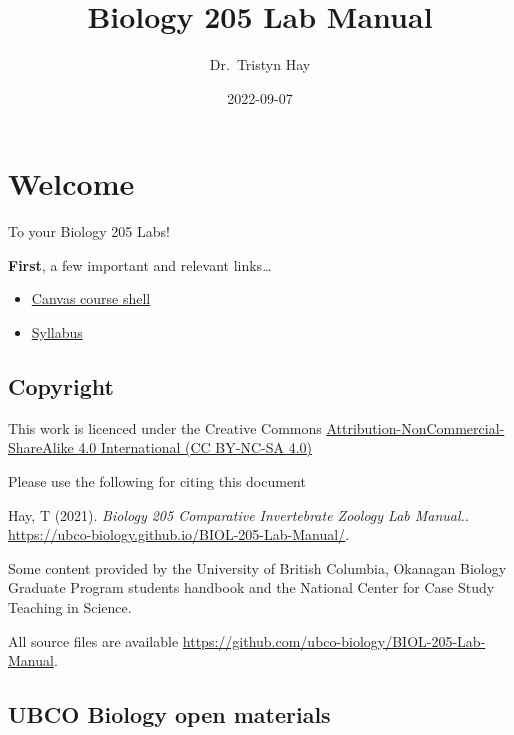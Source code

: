 \documentclass[
]{book}
\title{Biology 205 Lab Manual}
\author{Dr.~Tristyn Hay}
\date{2022-09-07}
\providecommand{\tightlist}{%
  \setlength{\itemsep}{0pt}\setlength{\parskip}{0pt}}
\begin{document}
\maketitle

{
\setcounter{tocdepth}{1}
\tableofcontents
}
\hypertarget{welcome}{%
\chapter*{Welcome}\label{welcome}}

To your Biology 205 Labs!

\textbf{First}, a few important and relevant links\ldots{}

\begin{itemize}
\tightlist
\item
  \href{https://canvas.ubc.ca/courses/113910}{Canvas course shell}
\item
  \href{https://canvas.ubc.ca/courses/113910/files/21718741?module_item_id=4662232}{Syllabus}
\end{itemize}

\hypertarget{copyright}{%
\section*{Copyright}\label{copyright}}

This work is licenced under the Creative Commons \href{https://creativecommons.org/licenses/by-nc-sa/4.0/}{Attribution-NonCommercial-ShareAlike 4.0 International (CC BY-NC-SA 4.0)}

Please use the following for citing this document

Hay, T (2021). \emph{Biology 205 Comparative Invertebrate Zoology Lab Manual.}. \url{https://ubco-biology.github.io/BIOL-205-Lab-Manual/}.

Some content provided by the University of British Columbia, Okanagan Biology Graduate Program students handbook and the National Center for Case Study Teaching in Science.

All source files are available \url{https://github.com/ubco-biology/BIOL-205-Lab-Manual}.

\hypertarget{ubco-biology-open-materials}{%
\section*{UBCO Biology open materials}\label{ubco-biology-open-materials}}
\end{document}
